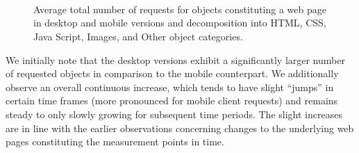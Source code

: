 \documentclass[onecolumn,12pt]{IEEEtran}
\begin{document}
\begin{figure}
\centering
	\\
	\\
	\\
\caption{Average total number of requests for objects constituting a web page in desktop and mobile versions and decomposition into  HTML, CSS, Java Script, Images, and Other object categories.\label{fig:requests}}
\end{figure}
We initially note that the desktop versions exhibit a significantly larger number of requested objects in comparison to the mobile counterpart.
We additionally observe an overall continuous increase, which tends to have slight ``jumps'' in certain time frames (more pronounced for mobile client requests) and remains steady to only slowly growing for subsequent time periods.
The slight increases are in line with the earlier observations concerning changes to the underlying web pages constituting the measurement points in time.
\end{document}

